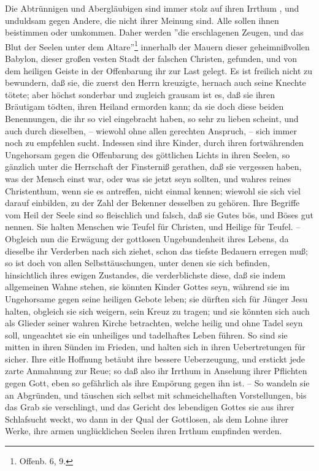 Die Abtrünnigen und Abergläubigen sind immer stolz auf ihren Irrthum , und unduldsam gegen Andere, die nicht ihrer Meinung sind. Alle sollen ihnen beistimmen oder umkommen. Daher werden ''die erschlagenen Zeugen, und das Blut der Seelen unter dem Altare''\footnote{Offenb. 6, 9.} innerhalb der Mauern dieser geheimnißvollen Babylon, dieser großen vesten Stadt der falschen Christen, gefunden, und von dem heiligen Geiste in der Offenbarung ihr zur Last gelegt. Es ist freilich nicht zu bewundern, daß sie, die zuerst den Herrn kreuzigte, hernach auch seine Knechte tötete; aber höchst sonderbar und zugleich grausam ist es, daß sie ihren Bräutigam tödten, ihren Heiland ermorden kann; da sie doch diese beiden Benennungen, die ihr so viel eingebracht haben, so sehr zu lieben scheint, und auch durch dieselben, – wiewohl ohne allen gerechten Anspruch, – sich immer noch zu empfehlen sucht. Indessen sind ihre Kinder, durch ihren fortwährenden Ungehorsam gegen die Offenbarung des göttlichen Lichts in ihren Seelen, so gänzlich unter die Herrschaft der Finsterniß gerathen, daß sie vergessen haben, was der Mensch einst war, oder was sie jetzt seyn sollten, und wahres reines Christenthum, wenn sie es antreffen, nicht einmal kennen; wiewohl sie sich viel darauf einbilden, zu der Zahl der Bekenner desselben zu gehören. Ihre Begriffe vom Heil der Seele sind so fleischlich und falsch, daß sie Gutes bös, und Böses gut nennen. Sie halten Menschen wie Teufel für Christen, und Heilige für Teufel. – Obgleich nun die Erwägung der gottlosen Ungebundenheit ihres Lebens, da dieselbe ihr Verderben nach sich ziehet, schon das tiefste Bedauern erregen muß; so ist doch von allen Selbsttäuschungen, unter denen sie sich befinden, hinsichtlich ihres ewigen Zustandes, die verderblichste diese, daß sie indem allgemeinen Wahne stehen, sie könnten Kinder Gottes seyn, während sie im Ungehorsame gegen seine heiligen Gebote leben; sie dürften sich für Jünger Jesu halten, obgleich sie sich weigern, sein Kreuz zu tragen; und sie könnten sich auch als Glieder seiner wahren Kirche betrachten, welche heilig und ohne Tadel seyn soll, ungeachtet sie ein unheiliges und tadelhaftes Leben führen. So sind sie mitten in ihren Sünden im Frieden, und halten sich in ihren Uebertretungen für sicher. Ihre eitle Hoffnung betäubt ihre bessere Ueberzeugung, und erstickt jede zarte Anmahnung zur Reue; so daß also ihr Irrthum in Ansehung ihrer Pflichten gegen Gott, eben so gefährlich als ihre Empörung gegen ihn ist. – So wandeln sie an Abgründen, und täuschen sich selbst mit schmeichelhaften Vorstellungen, bis das Grab sie verschlingt, und das Gericht des lebendigen Gottes sie aus ihrer Schlafsucht weckt, wo dann in der Qual der Gottlosen, als dem Lohne ihrer Werke, ihre armen unglücklichen Seelen ihren Irrthum empfinden werden.

